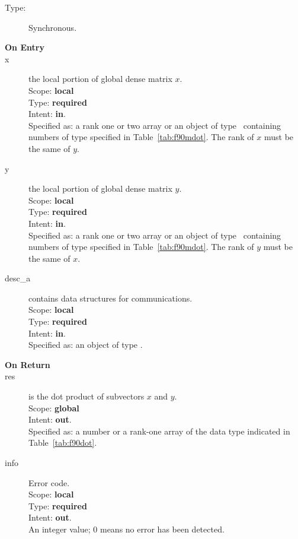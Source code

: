 \begin{description}
\item[Type:] Synchronous.
\item[\bf On Entry]
\item[x] the local portion of global dense matrix
$x$. \\
Scope: {\bf local} \\
Type: {\bf required} \\
Intent: {\bf in}.\\
Specified as:  a rank one or two array or an object of type \vdata\ 
containing numbers of type specified in
Table~\ref{tab:f90mdot}. The rank of $x$ must be the same of $y$. 
\item[y] the local portion of global dense matrix
$y$. \\
Scope: {\bf local} \\
Type: {\bf required} \\
Intent: {\bf in}.\\
Specified as:  a rank one or two array or an object of type \vdata\ 
containing numbers of type specified in
Table~\ref{tab:f90mdot}. The rank of $y$ must be the same of $x$. 
\item[desc\_a] contains data structures for communications.\\
Scope: {\bf local} \\
Type: {\bf required}\\
Intent: {\bf in}.\\
Specified as: an object of type \descdata.
\item[\bf On Return] 
\item[res] is the dot product of subvectors $x$ and $y$.\\
Scope: {\bf global} \\
Intent: {\bf out}.\\
Specified as: a number or a rank-one array  of the data type indicated
in Table~\ref{tab:f90dot}. 
\item[info] Error code.\\
Scope: {\bf local} \\
Type: {\bf required} \\
Intent: {\bf out}.\\
An integer value; 0 means no error has been detected. 
\end{description}

%
%


